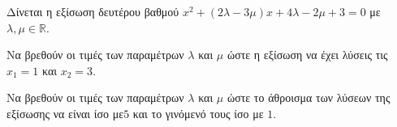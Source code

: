 Δίνεται η εξίσωση δευτέρου βαθμού $ x^2+(2\lambda-3\mu)x+4\lambda-2\mu+3=0 $ με $ \lambda,\mu\in\mathbb{R} $.
\begin{rlist}
\item Να βρεθούν οι τιμές των παραμέτρων $ \lambda $ και $ \mu $ ώστε η εξίσωση να έχει λύσεις τις $ x_1=1 $ και $ x_2=3 $.
\item Να βρεθούν οι τιμές των παραμέτρων $ \lambda $ και $ \mu $ ώστε το άθροισμα των λύσεων της εξίσωσης να είναι ίσο με$ 5 $ και το γινόμενό τους ίσο με $ 1 $.
\end{rlist}